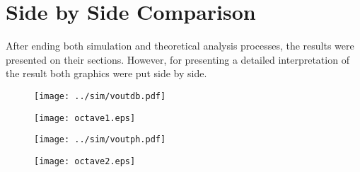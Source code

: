 \section{Side by Side Comparison}
\label{sec:comparison}

After ending both simulation and theoretical analysis processes, the results were presented on their sections. However, for presenting a detailed interpretation of the result both graphics were put side by side.

\begin{figure} [ht]
\centering
\begin{minipage}{.5\textwidth}
  \centering
  \texttt{[image: ../sim/voutdb.pdf]}
  \label{fig:sim41}
\end{minipage}%
\begin{minipage}{.5\textwidth}
  \centering
  \texttt{[image: octave1.eps]}
  \label{fig:vout_env}
\end{minipage}
\end{figure}



\begin{figure} [ht]
\centering
\begin{minipage}{.5\textwidth}
  \centering
  \texttt{[image: ../sim/voutph.pdf]}
  \label{fig:sim41}
\end{minipage}%
\begin{minipage}{.5\textwidth}
  \centering
  \texttt{[image: octave2.eps]}
  \label{fig:vout_env}
\end{minipage}
\end{figure}
%
%    
  

%    










